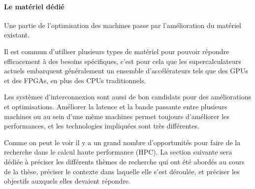\paragraph{Le matériel dédié}

Une partie de l'optimisation des machines passe par l'amélioration du matériel existant.

Il est commun d'utiliser plusieurs types de matériel pour pouvoir répondre efficacement à des besoins spécifiques, c'est pour cela que les supercalculateurs actuels embarquent généralement un ensemble d'accélérateurs tels que des GPUs et des FPGAs, en plus des CPUs traditionnels.

Les systèmes d'interconnexion sont aussi de bon candidats pour des améliorations et optimisations.
Améliorer la latence et la bande passante entre plusieurs machines ou au sein d'une même machines permet toujours d'améliorer les performances, et les technologies impliquées sont très différentes.



Comme on peut le voir il y a un grand nombre d'opportunités pour faire de la recherche dans le calcul haute performance (HPC).
La section suivante sera dédiée à préciser les différents thèmes de recherche qui ont été abordés au cours de la thèse, préciser le contexte dans laquelle elle s'est déroulée, et préciser les objectifs auxquels elles devaient répondre.






